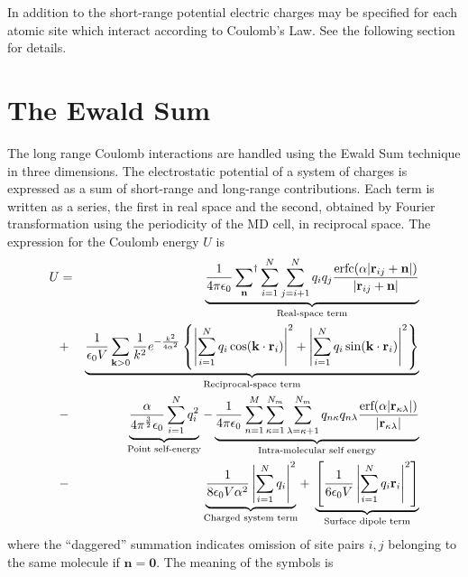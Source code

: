 \documentclass[a4paper,twoside]{report}
\providecommand{\bm}[1]{\mathbf{#1}}
\newcommand{\erf}{\mbox{erf}}
\newcommand{\erfc}{\mbox{erfc}}
\begin{document}
In addition to the short-range potential electric charges may be
specified for each atomic site which interact according to Coulomb's
Law.  See the following section for details.

\section{The Ewald Sum}%
\label{sec:ewald}
The long range Coulomb interactions are handled using the Ewald Sum
technique in three dimensions\cite[p.\ 156]{berthaut:52,allen:87}.
The electrostatic potential of a system of charges is expressed as a
sum of short-range and long-range contributions.  Each term is written
as a series, the first in real space and the second, obtained by
Fourier transformation using the periodicity of the MD cell, in
reciprocal space.  The expression for the Coulomb energy $U$ is
\begin{eqnarray}
\label{eqn:ewald}
U & = &  \underbrace{\frac{1}{4 \pi \epsilon_0}
\sideset{}{^\dag}\sum_{\bm{n}} \sum_{i=1}^{N} \sum_{j=i+1}^{N} q_iq_j
\frac{\erfc( \alpha | \bm{r}_{ij} +  \bm{n} |)}{| \bm{r}_{ij} +
\bm{n} | }}_{\textnormal{Real-space term}} 
\nonumber \\
 & + & \underbrace{\frac{1}{\epsilon_0 V} \sum_{\bm{k} > 0} \frac{1}{k^2}
       e^{-\frac{k^2}{4 \alpha^2}} 
\left \lbrace 
\left | \sum_{i=1}^{N} q_i \cos(\bm{k \cdot r}_i) \right |^2 + 
\left | \sum_{i=1}^{N} q_i \sin(\bm{k \cdot r}_i) \right |^2 
\right \rbrace}_{\textnormal{Reciprocal-space term}}\\
 & - & 
\underbrace{\frac{\alpha}{4 \pi^\frac{3}{2} \epsilon_0} 
\sum_{i=1}^{N} q_i^2}_{\textnormal{Point self-energy}} 
 - \underbrace{\frac{1}{4 \pi \epsilon_0} \sum_{n=1}^M
\sum_{\kappa=1}^{N_m} \sum_{\lambda=\kappa+1}^{N_m} q_{n\kappa} q_{n\lambda}
\frac{\erf( \alpha | \bm{r}_{\kappa\lambda} |)}{|
\bm{r}_{\kappa\lambda}| }}_{\textnormal{Intra-molecular self energy}}
\nonumber \\
& - & \underbrace{ \frac{1}{8 \epsilon_0 V \alpha^2}
                    \left | \sum_{i=1}^N q_i 
                    \right |^2}_{\textnormal{Charged system term}} +
\; \underbrace{\left [  \frac{1}{6 \epsilon_0 V} 
                    \left | \sum_{i=1}^N q_i \bm{r}_i 
                    \right |^2 \right ]}_{\textnormal{Surface dipole term}}
\nonumber
\end{eqnarray}
where the ``daggered'' summation indicates omission of site pairs $i,
j$ belonging to the same molecule if $\bm{n}=\bm{0}$.  The meaning of
the symbols is
\end{document}
